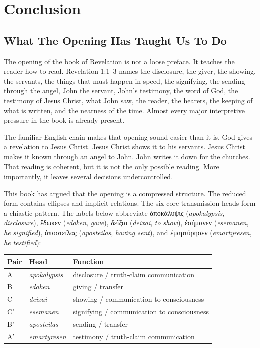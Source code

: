 \chapter{Conclusion}

\section{What The Opening Has Taught Us To Do}

The opening of the book of Revelation is not a loose preface. It teaches the reader how to read. Revelation 1:1--3 names the disclosure, the giver, the showing, the servants, the things that must happen in speed, the signifying, the sending through the angel, John the servant, John's testimony, the word of God, the testimony of Jesus Christ, what John saw, the reader, the hearers, the keeping of what is written, and the nearness of the time. Almost every major interpretive pressure in the book is already present.

The familiar English chain makes that opening sound easier than it is. God gives a revelation to Jesus Christ. Jesus Christ shows it to his servants. Jesus Christ makes it known through an angel to John. John writes it down for the churches. That reading is coherent, but it is not the only possible reading. More importantly, it leaves several decisions undercontrolled.

This book has argued that the opening is a compressed structure. The reduced form contains ellipses and implicit relations. The six core transmission heads form a chiastic pattern. The labels below abbreviate \textgreek{ἀποκάλυψις} (\textit{apokalypsis}, \textit{disclosure}), \textgreek{ἔδωκεν} (\textit{edoken}, \textit{gave}), \textgreek{δεῖξαι} (\textit{deixai}, \textit{to show}), \textgreek{ἐσήμανεν} (\textit{esemanen}, \textit{he signified}), \textgreek{ἀποστείλας} (\textit{aposteilas}, \textit{having sent}), and \textgreek{ἐμαρτύρησεν} (\textit{emartyresen}, \textit{he testified}):

\begin{center}
\begin{longtable}{@{}p{}p{}p{}@{}}
\toprule
Pair & Head & Function \\
\midrule
A & \textit{apokalypsis} & disclosure / truth-claim communication \\
B & \textit{edoken} & giving / transfer \\
C & \textit{deixai} & showing / communication to consciousness \\
C' & \textit{esemanen} & signifying / communication to consciousness \\
B' & \textit{aposteilas} & sending / transfer \\
A' & \textit{emartyresen} & testimony / truth-claim communication \\
\bottomrule
\end{longtable}
\end{center}

